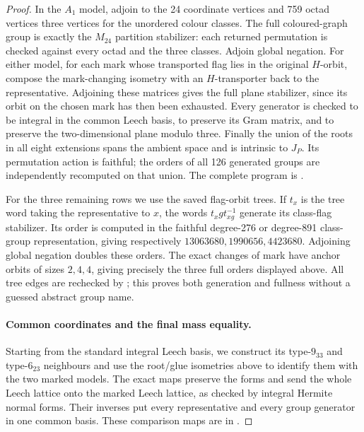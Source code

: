 \begin{proof}
In the \(A_1\) model, adjoin to the 24 coordinate vertices and
759 octad vertices three vertices for the unordered colour classes.
The full coloured-graph group is exactly the \(M_{24}\) partition
stabilizer: each returned permutation is checked against every
octad and the three classes. Adjoin global negation. For either
model, for each mark whose transported flag lies in the original
\(H\)-orbit, compose the mark-changing isometry with an
\(H\)-transporter back to the representative. Adjoining these
matrices gives the full plane stabilizer, since its orbit on the
chosen mark has then been exhausted. Every generator is checked
to be integral in the common Leech basis, to preserve its Gram
matrix, and to preserve the two-dimensional plane modulo three.
Finally the union of the roots in all eight extensions spans the
ambient space and is intrinsic to \(J_P\). Its permutation action
is faithful; the orders of all 126 generated groups are independently
recomputed on that union. The complete program is
.

For the three remaining rows we use the saved flag-orbit trees.
If \(t_x\) is the tree word taking the representative to \(x\),
the words \(t_x g t_{xg}^{-1}\) generate its class-flag stabilizer.
Its order is computed in the faithful degree-276 or degree-891
class-group representation, giving respectively
\(13063680,1990656,4423680\). Adjoining global negation doubles
these orders. The exact changes of mark have anchor orbits of
sizes \(2,4,4\), giving precisely the three full orders displayed
above. All tree edges are rechecked by
; this proves both generation and
fullness without a guessed abstract group name.

\paragraph{Common coordinates and the final mass equality.}
Starting from the standard integral Leech basis, we construct its
type-\(9_{33}\) and type-\(6_{23}\) neighbours and use the root/glue
isometries above to identify them with the two marked models. The
exact maps preserve the forms and send the whole Leech lattice
onto the marked Leech lattice, as checked by integral Hermite
normal forms. Their inverses put every representative and every
group generator in one common basis. These comparison maps are
in .


\end{proof}
